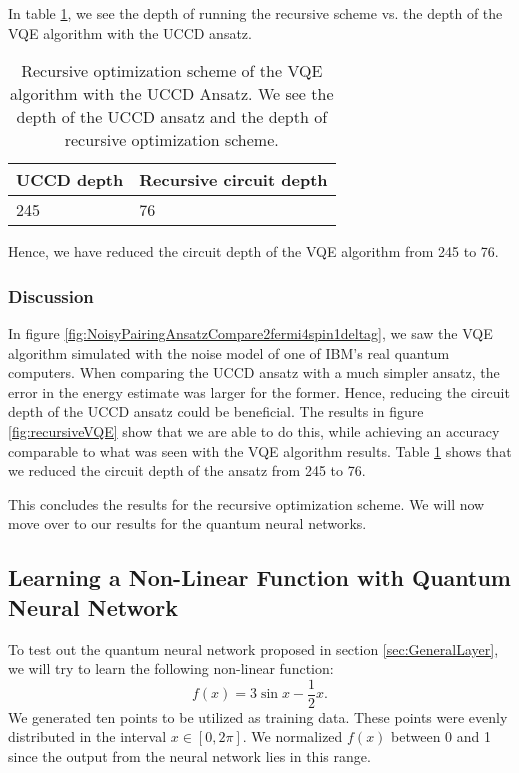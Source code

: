 In table \ref{tab:recursiveVQE}, we see the depth of running the recursive scheme vs. the depth of the VQE algorithm with the UCCD ansatz.
\begin{table}[H]
\centering
\caption{Recursive optimization scheme of the VQE algorithm with the UCCD Ansatz. We see the depth of the UCCD ansatz and the depth of recursive optimization scheme.}
\label{tab:recursiveVQE}
\begin{tabular}{|l|l|}
\hline
UCCD depth & Recursive circuit depth  \\ \hline
245        & 76                       \\ \hline           
\end{tabular}
\end{table}
Hence, we have reduced the circuit depth of the VQE algorithm from 245 to 76.

\subsubsection{Discussion}
In figure \ref{fig:NoisyPairingAnsatzCompare2fermi4spin1deltag}, we saw the VQE algorithm simulated with the noise model of one of IBM's real quantum computers. When comparing the UCCD ansatz with a much simpler ansatz, the error in the energy estimate was larger for the former. Hence, reducing the circuit depth of the UCCD ansatz could be beneficial. The results in figure \ref{fig:recursiveVQE} show that we are able to do this, while achieving an accuracy comparable to what was seen with the VQE algorithm results. Table \ref{tab:recursiveVQE} shows that we reduced the circuit depth of the ansatz from 245 to 76.

\bigskip 

This concludes the results for the recursive optimization scheme. We will now move over to our results for the quantum neural networks.



\subsection{Learning a Non-Linear Function with Quantum Neural Network}
\label{subsec:Non-LinearNeuralNetwork}
To test out the quantum neural network proposed in section \ref{sec:GeneralLayer}, we will try to learn the following non-linear function:
$$f(x) = 3 \sin{x} - \frac{1}{2}x.$$
We generated ten points to be utilized as training data. These points were evenly distributed in the interval
$x \in [0,2\pi].$ We normalized $f(x)$ between 0 and 1 since the output from the neural network lies in this range.

